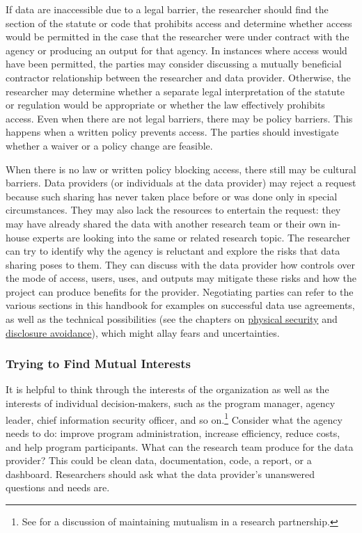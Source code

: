 \documentclass[
]{WileySix}
\begin{document}
If data are inaccessible due to a legal barrier, the researcher should find the section of the statute or code that prohibits access and determine whether access would be permitted in the case that the researcher were under contract with the agency or producing an output for that agency. In instances where access would have been permitted, the parties may consider discussing a mutually beneficial contractor relationship between the researcher and data provider. Otherwise, the researcher may determine whether a separate legal interpretation of the statute or regulation would be appropriate or whether the law effectively prohibits access. Even when there are not legal barriers, there may be policy barriers. This happens when a written policy prevents access. The parties should investigate whether a waiver or a policy change are feasible.

When there is no law or written policy blocking access, there still may be cultural barriers. Data providers (or individuals at the data provider) may reject a request because such sharing has never taken place before or was done only in special circumstances. They may also lack the resources to entertain the request: they may have already shared the data with another research team or their own in-house experts are looking into the same or related research topic. The researcher can try to identify why the agency is reluctant and explore the risks that data sharing poses to them. They can discuss with the data provider how controls over the mode of access, users, uses, and outputs may mitigate these risks and how the project can produce benefits for the provider. Negotiating parties can refer to the various sections in this handbook for examples on successful data use agreements, as well as the technical possibilities (see the chapters on \protect\hyperlink{security}{physical security} and \protect\hyperlink{discavoid}{disclosure avoidance}), which might allay fears and uncertainties.

\hypertarget{trying-to-find-mutual-interests}{%
\subsubsection{Trying to Find Mutual Interests}\label{trying-to-find-mutual-interests}}

It is helpful to think through the interests of the organization as well as the interests of individual decision-makers, such as the program manager, agency leader, chief information security officer, and so on.\footnote{See \citet{coburn2013} for a discussion of maintaining mutualism in a research partnership.} Consider what the agency needs to do: improve program administration, increase efficiency, reduce costs, and help program participants. What can the research team produce for the data provider? This could be clean data, documentation, code, a report, or a dashboard. Researchers should ask what the data provider's unanswered questions and needs are.
\end{document}

